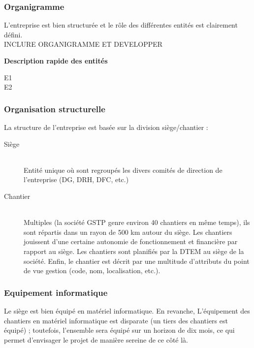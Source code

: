 \subsubsection{Organigramme}
L'entreprise est bien structurée et le rôle des différentes entités est clairement défini.\\

INCLURE ORGANIGRAMME ET DEVELOPPER

\textbf{Description rapide des entités}\hfill\\
\begin{description}

\item[E1]
\item[E2]

\end{description}


\subsubsection{Organisation structurelle}

La structure de l'entreprise est basée sur la division siège/chantier :
\begin{description}
\item[Siège]\hfill\\ 
Entité unique où sont regroupés les divers comités de direction de l'entreprise (DG, DRH, DFC, etc.)

\item[Chantier]\hfill\\
Multiples (la société GSTP genre environ 40 chantiers en même temps),
ils sont répartis dans un rayon de 500 km autour du siège.
Les chantiers jouissent d'une certaine autonomie de fonctionnement et
financière par rapport au siège. Les chantiers sont planifiés par la DTEM
au siège de la société. Enfin, le chantier est décrit par une multitude
d'attributs du point de vue gestion (code, nom, localisation, etc.).\\
\end{description}


\subsubsection{Equipement informatique}

Le siège est bien équipé en matériel informatique. En revanche, 
L'équipement des chantiers en matériel informatique est disparate (un tiers
des chantiers est équipé) ; toutefois, l'ensemble sera équipé sur un horizon de
dix mois, ce qui permet d'envisager le projet de manière sereine de ce côté
là.


